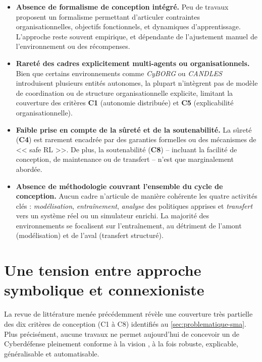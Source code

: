 \begin{itemize}
  \item \textbf{Absence de formalisme de conception intégré.} Peu de travaux proposent un formalisme permettant d’articuler contraintes organisationnelles, objectifs fonctionnels, et dynamiques d’apprentissage. L’approche reste souvent empirique, et dépendante de l’ajustement manuel de l’environnement ou des récompenses.

  \item \textbf{Rareté des cadres explicitement multi-agents ou organisationnels.} Bien que certains environnements comme \emph{CyBORG} ou \emph{CANDLES} introduisent plusieurs entités autonomes, la plupart n’intègrent pas de modèle de coordination ou de structure organisationnelle explicite, limitant la couverture des critères \textbf{C1} (autonomie distribuée) et \textbf{C5} (explicabilité organisationnelle).

  \item \textbf{Faible prise en compte de la sûreté et de la soutenabilité.} La sûreté (\textbf{C4}) est rarement encadrée par des garanties formelles ou des mécanismes de << safe RL >>. De plus, la soutenabilité (\textbf{C8}) -- incluant la facilité de conception, de maintenance ou de transfert -- n’est que marginalement abordée.

  \item \textbf{Absence de méthodologie couvrant l’ensemble du cycle de conception.} Aucun cadre n’articule de manière cohérente les quatre activités clés : \emph{modélisation}, \emph{entraînement}, \emph{analyse} des politiques apprises et \emph{transfert} vers un système réel ou un simulateur enrichi. La majorité des environnements se focalisent sur l'entraînement, au détriment de l’amont (modélisation) et de l’aval (transfert structuré).
\end{itemize}


\section{Une tension entre approche symbolique et connexioniste}\label{sec:limits-existing}

La revue de littérature menée précédemment révèle une couverture très partielle des dix critères de conception (C1 à C8) identifiés au \autoref{sec:problematique-sma}. Plus précisément, aucune travaux ne permet aujourd'hui de concevoir un  de Cyberdéfense pleinement conforme à la vision , à la fois robuste, explicable, généralisable et automatisable.

